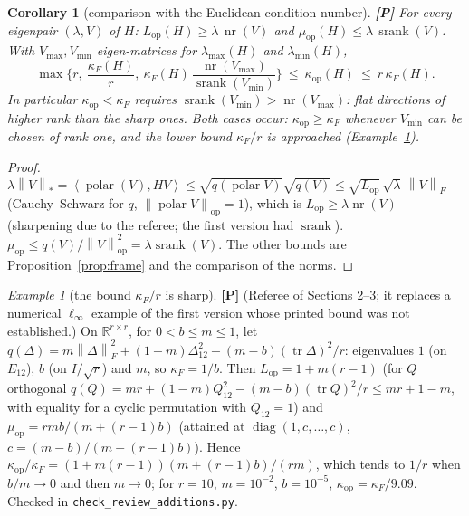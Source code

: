 \documentclass[11pt]{article}
\newtheorem{corollary}[theorem]{Corollary}
\theoremstyle{definition}
\theoremstyle{remark}
\newtheorem{example}[theorem]{Example}
\newcommand{\R}{\mathbb{R}}
\newcommand{\nop}[1]{\left\|#1\right\|_{\mathrm{op}}}
\newcommand{\nnuc}[1]{\left\|#1\right\|_{*}}
\newcommand{\nF}[1]{\left\|#1\right\|_{F}}
\newcommand{\inner}[2]{\left\langle #1, #2 \right\rangle}
\newcommand{\tr}{\operatorname{tr}}
\newcommand{\diag}{\operatorname{diag}}
\newcommand{\polar}{\operatorname{polar}}
\newcommand{\srank}{\operatorname{srank}}
\newcommand{\nr}{\operatorname{nr}}
\newcommand{\Lop}{L_{\mathrm{op}}}
\newcommand{\muop}{\mu_{\mathrm{op}}}
\newcommand{\kop}{\kappa_{\mathrm{op}}}
\newcommand{\kF}{\kappa_{F}}
\newcommand{\lmin}{\lambda_{\min}}
\newcommand{\lmax}{\lambda_{\max}}
\begin{document}
\begin{corollary}[comparison with the Euclidean condition number]\label{cor:compare} \textbf{[P]}
For every eigenpair $(\lambda,V)$ of $H$: $\Lop(H)\ge\lambda\,\nr(V)$ and $\muop(H)\le\lambda\,\srank(V)$. With
$V_{\max},V_{\min}$ eigen-matrices for $\lmax(H)$ and $\lmin(H)$,
\[
\max\Big\{r,\ \frac{\kF(H)}{r},\ \kF(H)\,\frac{\nr(V_{\max})}{\srank(V_{\min})}\Big\}\ \le\ \kop(H)\ \le\ r\,\kF(H).
\]
In particular $\kop<\kF$ requires $\srank(V_{\min})>\nr(V_{\max})$: flat directions of higher rank than the sharp
ones. Both cases occur: $\kop\ge\kF$ whenever $V_{\min}$ can be chosen of rank one, and the lower bound $\kF/r$ is
approached (Example~\ref{ex:sharp}).
\end{corollary}
\begin{proof}
$\lambda\nnuc V=\inner{\polar(V)}{HV}\le\sqrt{q(\polar V)}\sqrt{q(V)}\le\sqrt{\Lop}\,\sqrt\lambda\,\nF V$ (Cauchy--Schwarz
for $q$, $\nop{\polar V}=1$), which is $\Lop\ge\lambda\nr(V)$ (sharpening due to the referee; the first version had
$\srank$). $\muop\le q(V)/\nop V^2=\lambda\srank(V)$. The other bounds are Proposition~\ref{prop:frame} and the comparison
of the norms.
\end{proof}

\begin{example}[the bound $\kF/r$ is sharp]\label{ex:sharp} \textbf{[P]} (Referee of Sections 2--3; it replaces a
numerical $\ell_\infty$ example of the first version whose printed bound was not established.) On $\R^{r\times r}$, for
$0<b\le m\le1$, let $q(\Delta)=m\nF\Delta^2+(1-m)\Delta_{12}^2-(m-b)(\tr\Delta)^2/r$: eigenvalues $1$ (on $E_{12}$),
$b$ (on $I/\sqrt r$) and $m$, so $\kF=1/b$. Then $\Lop=1+m(r-1)$ (for $Q$ orthogonal
$q(Q)=mr+(1-m)Q_{12}^2-(m-b)(\tr Q)^2/r\le mr+1-m$, with equality for a cyclic permutation with $Q_{12}=1$) and
$\muop=rmb/(m+(r-1)b)$ (attained at $\diag(1,c,\dots,c)$, $c=(m-b)/(m+(r-1)b)$). Hence
$\kop/\kF=(1+m(r-1))(m+(r-1)b)/(rm)$, which tends to $1/r$ when $b/m\to0$ and then $m\to0$; for $r=10$, $m=10^{-2}$,
$b=10^{-5}$, $\kop=\kF/9.09$. Checked in \texttt{check\_review\_additions.py}.
\end{example}
\end{document}
